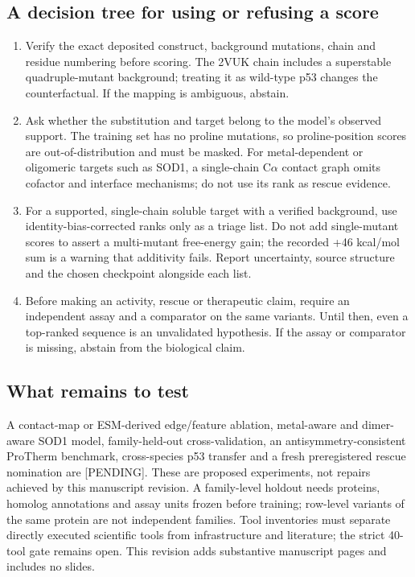 \subsection{A decision tree for using or refusing a score}
\begin{enumerate}
\item Verify the exact deposited construct, background mutations, chain and residue numbering before scoring. The 2VUK chain includes a superstable quadruple-mutant background; treating it as wild-type p53 changes the counterfactual. If the mapping is ambiguous, abstain.
\item Ask whether the substitution and target belong to the model's observed support. The training set has no proline mutations, so proline-position scores are out-of-distribution and must be masked. For metal-dependent or oligomeric targets such as SOD1, a single-chain C$\alpha$ contact graph omits cofactor and interface mechanisms; do not use its rank as rescue evidence.
\item For a supported, single-chain soluble target with a verified background, use identity-bias-corrected ranks only as a triage list. Do not add single-mutant scores to assert a multi-mutant free-energy gain; the recorded +46 kcal/mol sum is a warning that additivity fails. Report uncertainty, source structure and the chosen checkpoint alongside each list.
\item Before making an activity, rescue or therapeutic claim, require an independent assay and a comparator on the same variants. Until then, even a top-ranked sequence is an unvalidated hypothesis. If the assay or comparator is missing, abstain from the biological claim.
\end{enumerate}

\subsection{What remains to test}
A contact-map or ESM-derived edge/feature ablation, metal-aware and dimer-aware SOD1 model, family-held-out cross-validation, an antisymmetry-consistent ProTherm benchmark, cross-species p53 transfer and a fresh preregistered rescue nomination are [PENDING]. These are proposed experiments, not repairs achieved by this manuscript revision. A family-level holdout needs proteins, homolog annotations and assay units frozen before training; row-level variants of the same protein are not independent families. Tool inventories must separate directly executed scientific tools from infrastructure and literature; the strict 40-tool gate remains open. This revision adds substantive manuscript pages and includes no slides.
